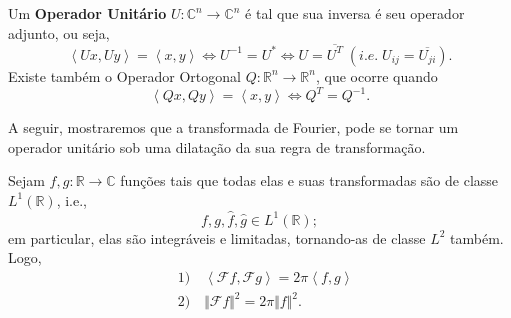 \documentclass[../pde_notes.tex]{subfiles}
\begin{document}
\begin{tcolorbox}[
		skin=enhanced,
		title=Lembrete!,
		after title={\hfill Operador Unitário e Ortogonal},
		fonttitle=\bfseries,
		sharp corners=downhill,
		colframe=black,
		colbacktitle=yellow!75!white,
		colback=yellow!30,
		colbacklower=black,
		coltitle=black,
		drop large lifted shadow
	]
	Um \hypertarget{unitary_operator}{\textbf{Operador Unitário}} \(U:\mathbb{C}^{n}\rightarrow \mathbb{C}^{n}\) é tal que sua inversa é seu operador adjunto, ou seja,
	\[
		\left< Ux, Uy \right> = \left< x, y \right> \Longleftrightarrow U^{-1}=U^{*} \Leftrightarrow U = \overline{U^{T}} \;(i.e.\; U_{ij} = \overline{U_{ji}}).
	\]
	Existe também o \hypertarget{orthogonal_operator}{Operador Ortogonal} \(Q:\mathbb{R}^{n}\rightarrow \mathbb{R}^{n}\), que ocorre quando
	\[
		\left< Qx, Qy \right> = \left< x, y \right> \Longleftrightarrow Q^{T} = Q^{-1}.
	\]
\end{tcolorbox}
A seguir, mostraremos que a transformada de Fourier, pode se tornar um operador unitário sob uma dilatação da sua regra de transformação.
\hypertarget{parseval_plancherel}{\begin{theorem*}
		Sejam \(f, g:\mathbb{R}\rightarrow \mathbb{C}\) funções tais que todas elas e suas transformadas são de classe \(L^{1}(\mathbb{R})\), i.e.,
		\[
			f, g, \hat{f}, \hat{g}\in L^{1}(\mathbb{R});
		\]
		em particular, elas são integráveis e limitadas, tornando-as de classe \(L^{2}\) também. Logo,
		\begin{align*}
			 & 1)\quad \left< \mathcal{F}f, \mathcal{F}g \right> = 2\pi \left< f, g \right> \\
			 & 2) \quad \Vert \mathcal{F}f \Vert^{2} = 2\pi \Vert f \Vert^{2}.
		\end{align*}
	\end{theorem*}}
\end{document}

